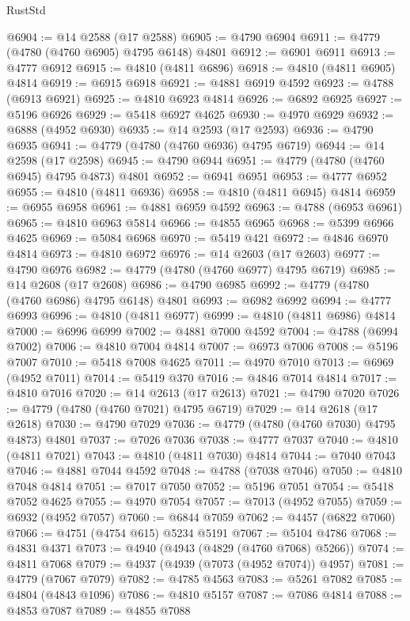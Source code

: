 \begin{lexlean}{RustStd}
\begin{coremodule}
@6904 := @14 @2588 (@17 @2588)
@6905 := @4790 @6904
@6911 := @4779 (@4780 (@4760 @6905) @4795 @6148) @4801
@6912 := @6901 @6911
@6913 := @4777 @6912
@6915 := @4810 (@4811 @6896)
@6918 := @4810 (@4811 @6905) @4814
@6919 := @6915 @6918
@6921 := @4881 @6919 @4592
@6923 := @4788 (@6913 @6921)
@6925 := @4810 @6923 @4814
@6926 := @6892 @6925
@6927 := @5196 @6926
@6929 := @5418 @6927 @4625
@6930 := @4970 @6929
@6932 := @6888 (@4952 @6930)
@6935 := @14 @2593 (@17 @2593)
@6936 := @4790 @6935
@6941 := @4779 (@4780 (@4760 @6936) @4795 @6719)
@6944 := @14 @2598 (@17 @2598)
@6945 := @4790 @6944
@6951 := @4779 (@4780 (@4760 @6945) @4795 @4873) @4801
@6952 := @6941 @6951
@6953 := @4777 @6952
@6955 := @4810 (@4811 @6936)
@6958 := @4810 (@4811 @6945) @4814
@6959 := @6955 @6958
@6961 := @4881 @6959 @4592
@6963 := @4788 (@6953 @6961)
@6965 := @4810 @6963 @5814
@6966 := @4855 @6965
@6968 := @5399 @6966 @4625
@6969 := @5084 @6968
@6970 := @5419 @421
@6972 := @4846 @6970 @4814
@6973 := @4810 @6972
@6976 := @14 @2603 (@17 @2603)
@6977 := @4790 @6976
@6982 := @4779 (@4780 (@4760 @6977) @4795 @6719)
@6985 := @14 @2608 (@17 @2608)
@6986 := @4790 @6985
@6992 := @4779 (@4780 (@4760 @6986) @4795 @6148) @4801
@6993 := @6982 @6992
@6994 := @4777 @6993
@6996 := @4810 (@4811 @6977)
@6999 := @4810 (@4811 @6986) @4814
@7000 := @6996 @6999
@7002 := @4881 @7000 @4592
@7004 := @4788 (@6994 @7002)
@7006 := @4810 @7004 @4814
@7007 := @6973 @7006
@7008 := @5196 @7007
@7010 := @5418 @7008 @4625
@7011 := @4970 @7010
@7013 := @6969 (@4952 @7011)
@7014 := @5419 @370
@7016 := @4846 @7014 @4814
@7017 := @4810 @7016
@7020 := @14 @2613 (@17 @2613)
@7021 := @4790 @7020
@7026 := @4779 (@4780 (@4760 @7021) @4795 @6719)
@7029 := @14 @2618 (@17 @2618)
@7030 := @4790 @7029
@7036 := @4779 (@4780 (@4760 @7030) @4795 @4873) @4801
@7037 := @7026 @7036
@7038 := @4777 @7037
@7040 := @4810 (@4811 @7021)
@7043 := @4810 (@4811 @7030) @4814
@7044 := @7040 @7043
@7046 := @4881 @7044 @4592
@7048 := @4788 (@7038 @7046)
@7050 := @4810 @7048 @4814
@7051 := @7017 @7050
@7052 := @5196 @7051
@7054 := @5418 @7052 @4625
@7055 := @4970 @7054
@7057 := @7013 (@4952 @7055)
@7059 := @6932 (@4952 @7057)
@7060 := @6844 @7059
@7062 := @4457 (@6822 @7060)
@7066 := @4751 (@4754 @615) @5234 @5191
@7067 := @5104 @4786
@7068 := @4831 @4371
@7073 := @4940 (@4943 (@4829 (@4760 @7068) @5266))
@7074 := @4811 @7068
@7079 := @4937 (@4939 (@7073 (@4952 @7074)) @4957)
@7081 := @4779 (@7067 @7079)
@7082 := @4785 @4563
@7083 := @5261 @7082
@7085 := @4804 (@4843 @1096)
@7086 := @4810 @5157
@7087 := @7086 @4814
@7088 := @4853 @7087
@7089 := @4855 @7088

\end{coremodule}
\end{lexlean}
